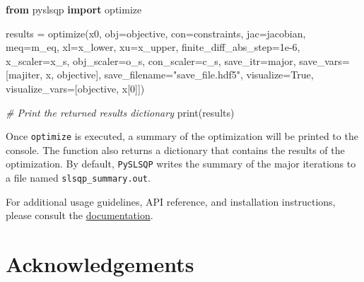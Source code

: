 \documentclass[
]{article}
\newenvironment{Shaded}{}{}
\newcommand{\BuiltInTok}[1]{\textcolor[rgb]{0.00,0.50,0.00}{#1}}
\newcommand{\CommentTok}[1]{\textcolor[rgb]{0.38,0.63,0.69}{\textit{#1}}}
\newcommand{\FloatTok}[1]{\textcolor[rgb]{0.25,0.63,0.44}{#1}}
\newcommand{\ImportTok}[1]{\textcolor[rgb]{0.00,0.50,0.00}{\textbf{#1}}}
\newcommand{\NormalTok}[1]{#1}
\newcommand{\OperatorTok}[1]{\textcolor[rgb]{0.40,0.40,0.40}{#1}}
\newcommand{\StringTok}[1]{\textcolor[rgb]{0.25,0.44,0.63}{#1}}
\newcommand{\VariableTok}[1]{\textcolor[rgb]{0.10,0.09,0.49}{#1}}
\begin{document}
\begin{Shaded}
\begin{Highlighting}[]
\ImportTok{from}\NormalTok{ pyslsqp }\ImportTok{import}\NormalTok{ optimize}

\NormalTok{results }\OperatorTok{=}\NormalTok{ optimize(x0, obj}\OperatorTok{=}\NormalTok{objective, con}\OperatorTok{=}\NormalTok{constraints, jac}\OperatorTok{=}\NormalTok{jacobian, }
\NormalTok{                   meq}\OperatorTok{=}\NormalTok{m\_eq, xl}\OperatorTok{=}\NormalTok{x\_lower, xu}\OperatorTok{=}\NormalTok{x\_upper, finite\_diff\_abs\_step}\OperatorTok{=}\FloatTok{1e{-}6}\NormalTok{,}
\NormalTok{                   x\_scaler}\OperatorTok{=}\NormalTok{x\_s, obj\_scaler}\OperatorTok{=}\NormalTok{o\_s, con\_scaler}\OperatorTok{=}\NormalTok{c\_s,}
\NormalTok{                   save\_itr}\OperatorTok{=}\StringTok{\textquotesingle{}major\textquotesingle{}}\NormalTok{, save\_vars}\OperatorTok{=}\NormalTok{[}\StringTok{\textquotesingle{}majiter\textquotesingle{}}\NormalTok{, }\StringTok{\textquotesingle{}x\textquotesingle{}}\NormalTok{, }\StringTok{\textquotesingle{}objective\textquotesingle{}}\NormalTok{],}
\NormalTok{                   save\_filename}\OperatorTok{=}\StringTok{"save\_file.hdf5"}\NormalTok{,}
\NormalTok{                   visualize}\OperatorTok{=}\VariableTok{True}\NormalTok{, visualize\_vars}\OperatorTok{=}\NormalTok{[}\StringTok{\textquotesingle{}objective\textquotesingle{}}\NormalTok{, }\StringTok{\textquotesingle{}x[0]\textquotesingle{}}\NormalTok{])}

\CommentTok{\# Print the returned results dictionary}
\BuiltInTok{print}\NormalTok{(results)}
\end{Highlighting}
\end{Shaded}

Once \texttt{optimize} is executed, a summary of the optimization will
be printed to the console. The function also returns a dictionary that
contains the results of the optimization. By default, \texttt{PySLSQP}
writes the summary of the major iterations to a file named
\texttt{slsqp\_summary.out}.

For additional usage guidelines, API reference, and installation
instructions, please consult the
\href{https://pyslsqp.readthedocs.io/}{documentation}.

\section{Acknowledgements}\label{acknowledgements}
\end{document}

